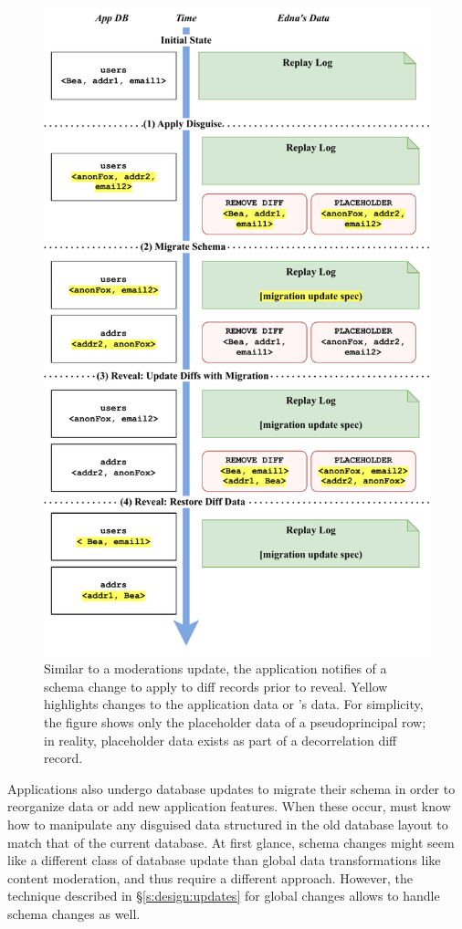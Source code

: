 \begin{figure}
    \centering
    \includegraphics[width=.8\textwidth]{figs/update-migration}
    \caption[During reveal, \sys applies reveal-time update specifications for
    schema changes.]{Similar to a moderations update, the
    application notifies \sys of a schema change to apply to diff records
    prior to reveal.  Yellow highlights changes to the application data or \sys's
    data. For simplicity, the figure shows only the placeholder data of a pseudoprincipal row; in reality, placeholder data exists as part of \eg a decorrelation
    diff record.}
\label{f:update:schema}
\end{figure}

%
Applications also undergo database updates to migrate their schema in
order to reorganize data or add new application features. When these occur, \sys
must know how to manipulate any disguised data structured in the old database
layout to match that of the current database.
%
At first glance, schema changes might seem like a different class of
database update than global data transformations like content moderation, and
thus require a different approach.
%
However, the technique described in \S\ref{s:design:updates} for global 
changes allows \sys to handle schema changes as well. 
%

